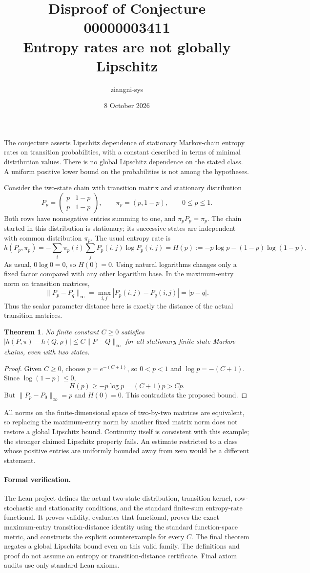 \documentclass[11pt]{article}
\title{Disproof of Conjecture 00000003411\\Entropy rates are not globally Lipschitz}
\author{ziangni-sys}
\date{8 October 2026}
\newtheorem{theorem}{Theorem}
\begin{document}
\maketitle
The conjecture asserts Lipschitz dependence of stationary Markov-chain entropy rates on transition probabilities, with a constant described in terms of minimal distribution values. There is no global Lipschitz dependence on the stated class. A uniform positive lower bound on the probabilities is not among the hypotheses.

Consider the two-state chain with transition matrix and stationary distribution
\[
 P_p=\begin{pmatrix}p&1-p\\p&1-p\end{pmatrix},
 \qquad \pi_p=(p,1-p),\qquad 0\le p\le1.
\]
Both rows have nonnegative entries summing to one, and $\pi_pP_p=\pi_p$. The chain started in this distribution is stationary; its successive states are independent with common distribution $\pi_p$. The usual entropy rate is
\[
 h(P_p,\pi_p)=-\sum_i\pi_p(i)\sum_jP_p(i,j)\log P_p(i,j)
 = H(p):=-p\log p-(1-p)\log(1-p).
\]
As usual, $0\log0=0$, so $H(0)=0$. Using natural logarithms changes only a fixed factor compared with any other logarithm base. In the maximum-entry norm on transition matrices,
\[
 \|P_p-P_q\|_\infty=\max_{i,j}|P_p(i,j)-P_q(i,j)|=|p-q|.
\]
Thus the scalar parameter distance here is exactly the distance of the actual transition matrices.

\begin{theorem}
No finite constant $C\ge0$ satisfies
$|h(P,\pi)-h(Q,\rho)|\le C\|P-Q\|_\infty$
for all stationary finite-state Markov chains, even with two states.
\end{theorem}
\begin{proof}
Given $C\ge0$, choose $p=e^{-(C+1)}$, so $0<p<1$ and $\log p=-(C+1)$. Since $\log(1-p)\le0$,
\[
 H(p)\ge-p\log p=(C+1)p>Cp.
\]
But $\|P_p-P_0\|_\infty=p$ and $H(0)=0$. This contradicts the proposed bound.
\end{proof}
All norms on the finite-dimensional space of two-by-two matrices are equivalent, so replacing the maximum-entry norm by another fixed matrix norm does not restore a global Lipschitz bound. Continuity itself is consistent with this example; the stronger claimed Lipschitz property fails. An estimate restricted to a class whose positive entries are uniformly bounded away from zero would be a different statement.

\paragraph{Formal verification.}\sloppy
The Lean project defines the actual two-state distribution, transition kernel, row-stochastic and stationarity conditions, and the standard finite-sum entropy-rate functional. It proves validity, evaluates that functional, proves the exact maximum-entry transition-distance identity using the standard function-space metric, and constructs the explicit counterexample for every $C$. The final theorem negates a global Lipschitz bound even on this valid family. The definitions and proof do not assume an entropy or transition-distance certificate. Final axiom audits use only standard Lean axioms.
\end{document}
